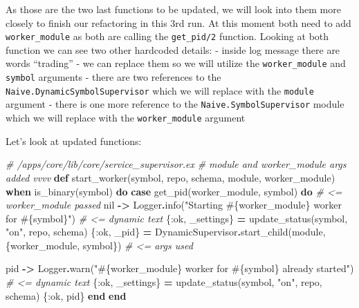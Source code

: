 \documentclass[
  oneside]{book}
\newenvironment{Shaded}{\begin{snugshade}}{\end{snugshade}}
\newcommand{\CommentTok}[1]{\textcolor[rgb]{0.56,0.35,0.01}{\textit{#1}}}
\newcommand{\ConstantTok}[1]{\textcolor[rgb]{0.00,0.00,0.00}{#1}}
\newcommand{\KeywordTok}[1]{\textcolor[rgb]{0.13,0.29,0.53}{\textbf{#1}}}
\newcommand{\NormalTok}[1]{#1}
\newcommand{\OperatorTok}[1]{\textcolor[rgb]{0.81,0.36,0.00}{\textbf{#1}}}
\newcommand{\OtherTok}[1]{\textcolor[rgb]{0.56,0.35,0.01}{#1}}
\newcommand{\StringTok}[1]{\textcolor[rgb]{0.31,0.60,0.02}{#1}}
\newcommand{\VariableTok}[1]{\textcolor[rgb]{0.00,0.00,0.00}{#1}}
\begin{document}
As those are the two last functions to be updated, we will look into them more closely to finish our refactoring in this 3rd run. At this moment both need to add \texttt{worker\_module} as both are calling the \texttt{get\_pid/2} function. Looking at both function we can see two other hardcoded details:
- inside log message there are words ``trading'' - we can replace them so we will utilize the \texttt{worker\_module} and \texttt{symbol} arguments
- there are two references to the \texttt{Naive.DynamicSymbolSupervisor} which we will replace with the \texttt{module} argument
- there is one more reference to the \texttt{Naive.SymbolSupervisor} module which we will replace with the \texttt{worker\_module} argument

Let's look at updated functions:

\begin{Shaded}
\begin{Highlighting}[]
  \CommentTok{\# /apps/core/lib/core/service\_supervisor.ex}
  \CommentTok{\# module and worker\_module args added vvvv}
  \KeywordTok{def}\NormalTok{ start\_worker(symbol, repo, schema, module, worker\_module)}
      \KeywordTok{when}\NormalTok{ is\_binary(symbol) }\KeywordTok{do}
    \KeywordTok{case}\NormalTok{ get\_pid(worker\_module, symbol) }\KeywordTok{do} \CommentTok{\# \textless{}= worker\_module passed}
      \ConstantTok{nil} \OperatorTok{{-}\textgreater{}}
        \ConstantTok{Logger}\OperatorTok{.}\NormalTok{info(}\StringTok{"Starting }\OtherTok{\#\{}\NormalTok{worker\_module}\OtherTok{\}}\StringTok{ worker for }\OtherTok{\#\{}\NormalTok{symbol}\OtherTok{\}}\StringTok{"}\NormalTok{) }\CommentTok{\# \textless{}= dynamic text}
\NormalTok{        \{}\VariableTok{:ok}\NormalTok{, \_settings\} }\OperatorTok{=}\NormalTok{ update\_status(symbol, }\StringTok{"on"}\NormalTok{, repo, schema)}
\NormalTok{        \{}\VariableTok{:ok}\NormalTok{, \_pid\} }\OperatorTok{=} \ConstantTok{DynamicSupervisor}\OperatorTok{.}\NormalTok{start\_child(module, \{worker\_module, symbol\}) }\CommentTok{\# \textless{}= args used}

\NormalTok{      pid }\OperatorTok{{-}\textgreater{}}
        \ConstantTok{Logger}\OperatorTok{.}\NormalTok{warn(}\StringTok{"}\OtherTok{\#\{}\NormalTok{worker\_module}\OtherTok{\}}\StringTok{ worker for }\OtherTok{\#\{}\NormalTok{symbol}\OtherTok{\}}\StringTok{ already started"}\NormalTok{) }\CommentTok{\# \textless{}= dynamic text}
\NormalTok{        \{}\VariableTok{:ok}\NormalTok{, \_settings\} }\OperatorTok{=}\NormalTok{ update\_status(symbol, }\StringTok{"on"}\NormalTok{, repo, schema)}
\NormalTok{        \{}\VariableTok{:ok}\NormalTok{, pid\}}
    \KeywordTok{end}
  \KeywordTok{end}


\end{Highlighting}
\end{Shaded}
\end{document}
